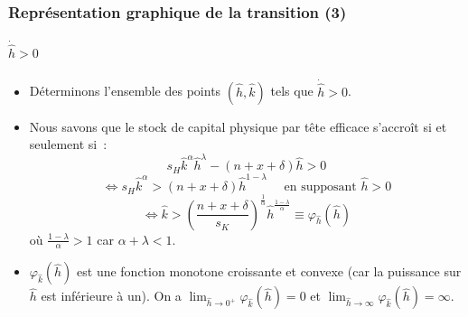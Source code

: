 \documentclass[10pt,notheorems]{beamer}
\theoremstyle{plain}
\theoremstyle{definition} %
\begin{document}
\begin{frame}
  \frametitle{Représentation graphique de la transition (3)}
  \framesubtitle{$\dot{\hat h}>0$}
  \begin{itemize}

  \item Déterminons l'ensemble des points $(\hat h, \hat k)$ tels que $\dot{\hat h}>0$.\newline

  \item Nous savons que le stock de capital physique par tête efficace s'accroît si et seulement si~:
    \[
      s_H\hat k^\alpha \hat h^\lambda - (n+x+\delta) \hat h > 0
    \]
    \[
      \Leftrightarrow s_H \hat k^{\alpha} > (n+x+\delta) \hat h^{1-\lambda} \quad\text{ en supposant }\hat h>0
    \]
    \[
      \Leftrightarrow \hat k > \left(\frac{n+x+\delta}{s_K}\right)^{\frac{1}{\alpha}} \hat h^{\frac{1-\lambda}{\alpha}}\equiv \varphi_{\hat h}(\hat h)
    \]
    où $\frac{1-\lambda}{\alpha}>1$ car $\alpha+\lambda<1$.\newline

  \item $\varphi_{\hat k}(\hat h)$ est une fonction monotone croissante et convexe (car la puissance sur $\hat h$ est inférieure à un). On a $\lim_{\hat h\rightarrow 0^+}\varphi_{\hat k}(\hat h) = 0$ et $\lim_{\hat h\rightarrow \infty}\varphi_{\hat k}(\hat h) = \infty$.\newline

  \end{itemize}

\end{frame}
\end{document}
